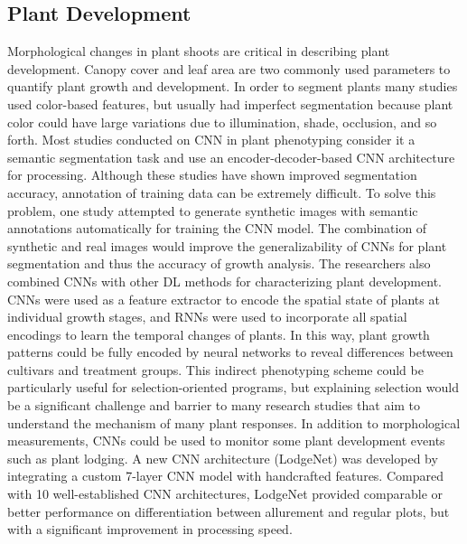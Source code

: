 \subsection{Plant Development}
Morphological changes in plant shoots are critical in describing plant development. Canopy cover and leaf area are two commonly used parameters to quantify plant
growth and development. In order to segment plants many studies used color-based features, but usually had imperfect segmentation because plant color could have large
variations due to illumination, shade, occlusion, and so forth. Most studies conducted on CNN in plant phenotyping consider it a semantic segmentation task and use
an encoder-decoder-based CNN architecture for processing. Although these studies have shown improved segmentation accuracy, annotation of training data can be
extremely difficult. To solve this problem, one study attempted to generate synthetic images with semantic annotations automatically for training the CNN model.
The combination of synthetic and real images would improve the generalizability of CNNs for plant segmentation and thus the accuracy of growth analysis.
The researchers also combined CNNs with other DL methods for characterizing plant development. CNNs were used as a feature extractor to encode the spatial
state of plants at individual growth stages, and RNNs were used to incorporate all spatial encodings to learn the temporal changes of plants. In this way,
plant growth patterns could be fully encoded by neural networks to reveal differences between cultivars and treatment groups. This indirect phenotyping scheme
could be particularly useful for selection-oriented programs, but explaining selection would be a significant challenge and barrier to many research studies that
aim to understand the mechanism of many plant responses. In addition to morphological measurements, CNNs could be used to monitor some plant development events
such as plant lodging. A new CNN architecture (LodgeNet) was developed by integrating a custom 7-layer CNN model with handcrafted features. Compared with
10 well-established CNN architectures, LodgeNet provided comparable or better performance on differentiation between allurement and regular plots, but with a
significant improvement in processing speed.

